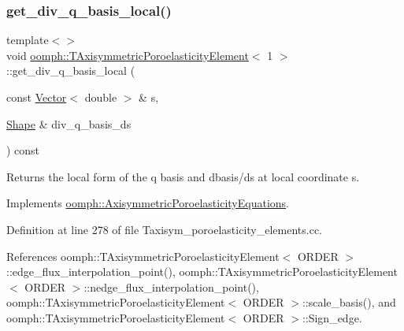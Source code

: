 \subsubsection{\texorpdfstring{get\+\_\+div\+\_\+q\+\_\+basis\+\_\+local()}{get\_div\_q\_basis\_local()}\hspace{0.1cm}{\footnotesize\ttfamily [2/3]}}
{\footnotesize\ttfamily template$<$$>$ \\
void \hyperlink{classoomph_1_1TAxisymmetricPoroelasticityElement}{oomph\+::\+T\+Axisymmetric\+Poroelasticity\+Element}$<$ 1 $>$\+::get\+\_\+div\+\_\+q\+\_\+basis\+\_\+local (\begin{DoxyParamCaption}\item[{const \hyperlink{classoomph_1_1Vector}{Vector}$<$ double $>$ \&}]{s,  }\item[{\hyperlink{classoomph_1_1Shape}{Shape} \&}]{div\+\_\+q\+\_\+basis\+\_\+ds }\end{DoxyParamCaption}) const\hspace{0.3cm}{\ttfamily [virtual]}}



Returns the local form of the q basis and dbasis/ds at local coordinate s. 



Implements \hyperlink{classoomph_1_1AxisymmetricPoroelasticityEquations_abe3e6e28eb58ae719a6180d0d57b1815}{oomph\+::\+Axisymmetric\+Poroelasticity\+Equations}.



Definition at line 278 of file Taxisym\+\_\+poroelasticity\+\_\+elements.\+cc.



References oomph\+::\+T\+Axisymmetric\+Poroelasticity\+Element$<$ O\+R\+D\+E\+R $>$\+::edge\+\_\+flux\+\_\+interpolation\+\_\+point(), oomph\+::\+T\+Axisymmetric\+Poroelasticity\+Element$<$ O\+R\+D\+E\+R $>$\+::nedge\+\_\+flux\+\_\+interpolation\+\_\+point(), oomph\+::\+T\+Axisymmetric\+Poroelasticity\+Element$<$ O\+R\+D\+E\+R $>$\+::scale\+\_\+basis(), and oomph\+::\+T\+Axisymmetric\+Poroelasticity\+Element$<$ O\+R\+D\+E\+R $>$\+::\+Sign\+\_\+edge.

\mbox{\label{classoomph_1_1TAxisymmetricPoroelasticityElement_a9d5dc0246e71dce2e217a45754d05472}} 
